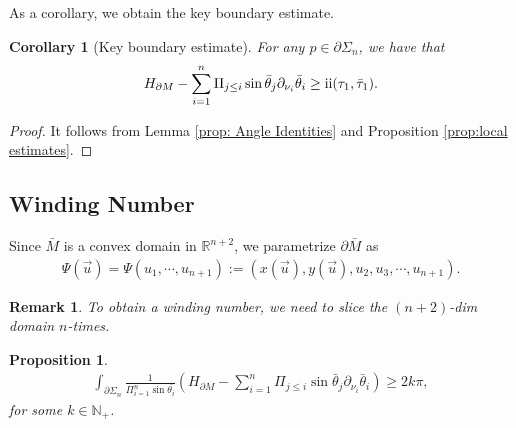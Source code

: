 \documentclass[11pt,letterpaper]{amsart}
\newcommand{\RN}[1]{%
  \textup{\uppercase\expandafter{\romannumeral#1}}%
}
\newtheorem{cor}{Corollary}[section]
\newtheorem{prop}{Proposition}[section]
\newtheorem{rem}{Remark}[section]
\begin{document}
As a corollary, we obtain the key boundary estimate.
\begin{cor}[Key boundary estimate]\label{cor: key estmate}
    For any $p\in\partial\Sigma_n$, we have that
    \begin{align}
       H_{\partial M}-\sum_{i=1}^n\Pi_{j\leq i}\sin\bar{\theta}_j\partial_{\nu_i}\bar{\theta}_i\geq \RN{2}(\tau_1,\bar{\tau}_1).
    \end{align}
\end{cor}
\begin{proof}
    It follows from Lemma \ref{prop: Angle Identities} and Proposition \ref{prop:local estimates}.
\end{proof}
\subsection{Winding  Number}
Since $\bar{M}$ is a convex domain in $\mathbb R^{n+2}$, we parametrize $\partial \bar{M}$ as 
        \begin{align}
            \Psi(\vec{u})=\Psi(u_1,\cdots, u_{n+1}):=(x(\vec{u}),y(\vec{u}),u_2,u_3,\cdots, u_{n+1}).
        \end{align}
  \begin{rem}
      To obtain a winding number, we need to slice the $(n+2)$-dim domain $n$-times.
  \end{rem}      
\begin{prop} \label{prop: winding number}
\begin{align}
    \int_{\partial\Sigma_n}\frac{1}{\Pi_{i=1}^n\sin\bar{\theta_i}}\left(H_{\partial M}-\sum_{i=1}^n\Pi_{j\leq i}\sin\bar{\theta}_j\partial_{\nu_i}\bar{\theta}_i\right)\geq 2k\pi,
    \end{align}
    for some $k\in\mathbb N_+$.
\end{prop}
\end{document}
